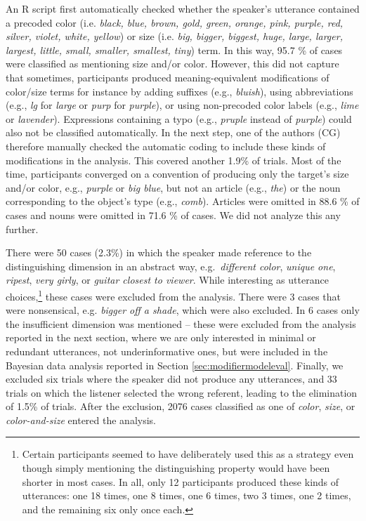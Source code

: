 \documentclass[11pt]{article}
\newcommand{\sectionref}[1]{Section \ref{#1}}
\begin{document}
An R script first automatically checked whether the speaker's utterance contained a precoded color (i.e. \emph{black, blue, brown, gold, green, orange, pink, purple, red, silver, violet, white, yellow}) or size (i.e. \emph{big, bigger, biggest, huge, large, larger, largest, little, small, smaller, smallest, tiny}) term. In this way, 95.7 \% of cases were classified as mentioning size and/or color. However, this did not capture that sometimes, participants produced meaning-equivalent modifications of color/size terms for instance by adding suffixes (e.g., \emph{bluish}), using abbreviations (e.g., \emph{lg} for \emph{large} or \emph{purp} for \emph{purple}), or using non-precoded color labels (e.g., \emph{lime} or \emph{lavender}). Expressions containing a typo (e.g., \emph{pruple} instead of \emph{purple}) could also not be classified automatically. In the next step, one of the authors (CG) therefore manually checked the automatic coding to include these kinds of modifications in the analysis. This covered another 1.9\% of trials. Most of the time, participants converged on a convention of producing only the target's size and/or color, e.g., \emph{purple} or \emph{big blue}, but not an article (e.g., \emph{the}) or the noun corresponding to the object's type  (e.g., \emph{comb}). Articles were omitted in 88.6 \% of cases and nouns were omitted in 71.6 \% of cases. We did not analyze this any further.

There were 50 cases (2.3\%) in which the speaker made reference to the distinguishing dimension in an abstract way, e.g.~\emph{different color}, \emph{unique one}, \emph{ripest}, \emph{very girly}, or \emph{guitar closest to viewer}. While interesting as utterance choices,\footnote{Certain participants seemed to have deliberately used this as a strategy even though simply mentioning the distinguishing property would have been shorter in most cases. In all, only 12 participants produced these kinds of utterances: one 18 times, one 8 times, one 6 times, two 3 times, one 2 times, and the remaining six only once each.} these cases were excluded from the analysis. There were 3 cases that were nonsensical, e.g. \emph{bigger off a shade}, which were also excluded. In 6 cases only the insufficient dimension was mentioned -- these were excluded from the analysis reported in the next section, where we are only interested in minimal or redundant utterances, not underinformative ones, but were included in the Bayesian data analysis reported in \sectionref{sec:modifiermodeleval}. Finally, we excluded six trials where the speaker did not produce any utterances, and 33 trials on which the listener selected the wrong referent, leading to the elimination of 1.5\% of trials. After the exclusion, 2076 cases classified as one of \emph{color}, \emph{size}, or \emph{color-and-size} entered the analysis. 
\end{document}
